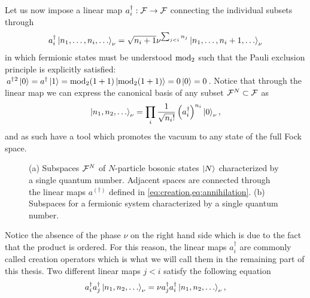 Let us now impose a linear map $a^\dag_i:\mathcal{F}\rightarrow\mathcal{F}$ connecting the individual subsets through
\begin{align}
    a^\dag_i\ket{n_1,\dots,n_i,\dots}_\nu = \sqrt{n_i+1}\nu^{\sum_{j<i}n_j}\ket{n_1,\dots,n_i+1,\dots}_\nu
    \label{eq:creation}
\end{align}
in which fermionic states must be understood ${\rm mod}_2$ such that the Pauli exclusion principle is explicitly satisfied: $a^\dag{}^2\ket{0}=a^\dag\ket{1}={\rm mod}_2(1+1)\ket{{\rm mod}_2(1+1)} = 0\ket{0} = 0$.
Notice that through the linear map we can express the canonical basis of any subset $\mathcal{F}^N\subset\mathcal{F}$ as
\begin{align}
    \ket{n_1,n_2,\dots}_\nu = \prod_i\frac1{\sqrt{n_i!}}\left(a^\dag_i\right)^{n_i}\ket{0}_\nu,
    \label{eq:Fock_basis}
\end{align}
and as such have a tool which promotes the vacuum to any state of the full Fock space.
\begin{figure}
    \centering
    \hfil
    \caption{(a) Subspaces $\mathcal{F}^N$ of $N$-particle bosonic states $\ket{N}$ characterized by a single quantum number. Adjacent spaces are connected through the linear maps $a^{(\dag)}$ defined in \cref{eq:creation,eq:annihilation}. (b) Subspaces for a fermionic system characterized by a single quantum number.}
    \label{fig:fock_spaces}
\end{figure}
Notice the absence of the phase $\nu$ on the right hand side which is due to the fact that the product is ordered.
For this reason, the linear maps $a^\dag_i$ are commonly called creation operators which is what we will call them in the remaining part of this thesis.
Two different linear maps $j<i$ satisfy the following equation
\begin{align}
    a^\dag_i a^\dag_j\ket{n_1,n_2,\dots}_\nu = \nu a^\dag_ja^\dag_i\ket{n_1,n_2,\dots}_\nu,
\end{align}
